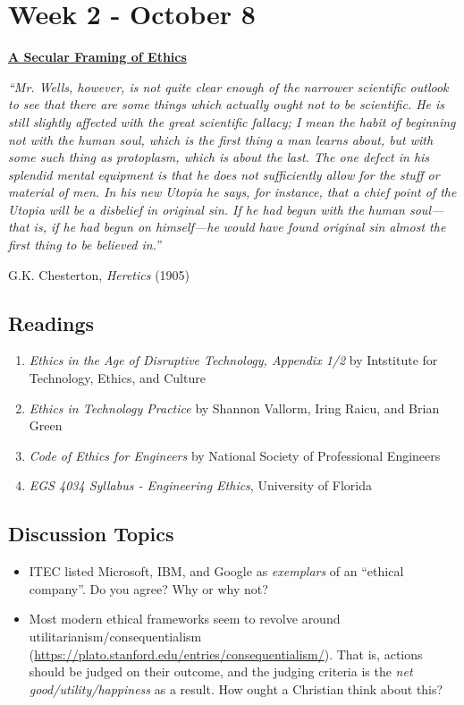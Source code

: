 \documentclass[12pt]{article}
\let\oldsection\section
\renewcommand\section{\clearpage\oldsection}
\begin{document}
\section*{Week 2 - October 8}
\label{sec:org2b8bb2b}
\begin{center}
\large \textbf{\uline{A Secular Framing of Ethics}}
\end{center}
\begin{mdframed}
\emph{``Mr. Wells, however, is not quite clear enough of the narrower scientific outlook
to see that there are some things which actually ought not to be scientific. He
is still slightly affected with the great scientific fallacy; I mean the habit
of beginning not with the human soul, which is the first thing a man learns
about, but with some such thing as protoplasm, which is about the last. The one
defect in his splendid mental equipment is that he does not sufficiently allow
for the stuff or material of men. In his new Utopia he says, for instance, that
a chief point of the Utopia will be a disbelief in original sin. If he had begun
with the human soul—that is, if he had begun on himself—he would have found
original sin almost the first thing to be believed in.''}

\hfill G.K. Chesterton, \emph{Heretics} (1905)
\end{mdframed}
\subsection*{Readings}
\label{sec:org63f2c4d}
\begin{enumerate}
\item \emph{Ethics in the Age of Disruptive Technology, Appendix 1/2} by Intstitute for
Technology, Ethics, and Culture
\item \emph{Ethics in Technology Practice} by Shannon Vallorm, Iring Raicu, and Brian
Green
\item \emph{Code of Ethics for Engineers} by National Society of Professional Engineers
\item \emph{EGS 4034 Syllabus - Engineering Ethics}, University of Florida
\end{enumerate}
\subsection*{Discussion Topics}
\label{sec:orgea950e9}
\begin{itemize}
\item ITEC listed Microsoft, IBM, and Google as \emph{exemplars} of an ``ethical company''.
Do you agree? Why or why not?
\item Most modern ethical frameworks seem to revolve around
utilitarianism/consequentialism
(\url{https://plato.stanford.edu/entries/consequentialism/}). That is, actions
should be judged on their outcome, and the judging criteria is the \emph{net
good/utility/happiness} as a result. How ought a Christian think about this?
\end{itemize}
\end{document}
